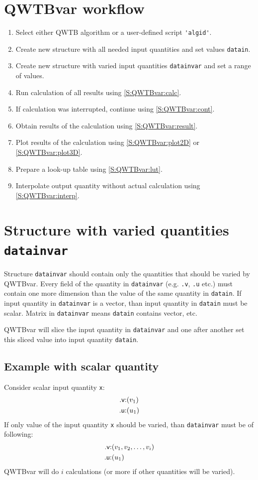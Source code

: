 \documentclass[12pt,a4paper,oneside]{report} %
\newcommand{\li}[1]{\lstinline{#1}}     %
\begin{document}
\section{QWTBvar workflow}
\begin{enumerate}
    \item Select either QWTB algorithm or a user-defined script \li{'algid'}.
    \item Create new structure with all needed input quantities and set values \li{datain}.
    \item Create new structure with varied input quantities \li{datainvar} and set a range of values.
    \item Run calculation of all results using \ref{S:QWTBvar:calc}.
    \item If calculation was interrupted, continue using \ref{S:QWTBvar:cont}.
    \item Obtain results of the calculation using \ref{S:QWTBvar:result}.
    \item Plot results of the calculation using \ref{S:QWTBvar:plot2D} or \ref{S:QWTBvar:plot3D}.
    \item Prepare a look-up table using \ref{S:QWTBvar:lut}.
    \item Interpolate output quantity without actual calculation using \ref{S:QWTBvar:interp}.
\end{enumerate}

\section{Structure with varied quantities \tt datainvar}
\label{S:QWTBvar:datainvar}
Structure \li{datainvar} should contain only the quantities that should be varied by QWTBvar.
Every field of the quantity in
\li{datainvar} (e.g. \li{.v}, \li{.u} etc.) must contain
one more dimension than the value of the same quantity in \li{datain}. If
input quantity in \li{datainvar} is a vector, than input quantity in
\li{datain} must be scalar. Matrix in \li{datainvar} means
\li{datain} contains vector, etc.

QWTBvar will slice the input quantity in \li{datainvar} and one after
another set this sliced value into input quantity \li{datain}.

\subsection{Example with scalar quantity}
Consider scalar input quantity \li{x}:
\begin{eqnarray*}
    \text{\textsf{.v}:} & (v_1)\\
    \text{\textsf{.u}:} & (u_1)\\
\end{eqnarray*}
If only value of the input quantity \li{x} should be varied, than
\li{datainvar} must be of following:
\begin{eqnarray*}
    \text{\textsf{.v}:} & (v_1, v_2, \dots, v_i)\\
    \text{\textsf{.u}:} & (u_1)\\
\end{eqnarray*}
QWTBvar will do $i$ calculations (or more if other quantities will be varied).
\end{document}
